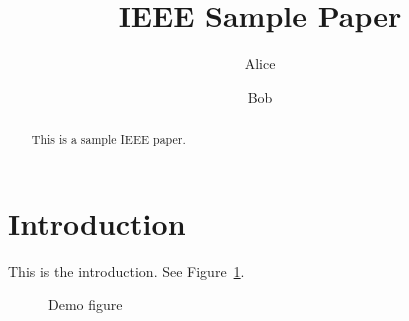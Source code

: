 \documentclass[sigconf]{acmart}
\begin{document}
\title{IEEE Sample Paper}
\author{Alice}
\author{Bob}
\begin{abstract}
This is a sample IEEE paper.
\end{abstract}

\maketitle
\section{Introduction}
This is the introduction. See Figure~\ref{fig:demo}. \cite{ref1}
\begin{figure}[tbp]
\caption{Demo figure}
\label{fig:demo}
\end{figure}



\end{document}
